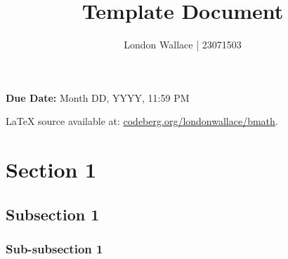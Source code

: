 \documentclass{article}
\title{Template Document}
\author{London Wallace | 23071503}
\date{}
\begin{document}
\maketitle{}

\begin{flushleft}
	\textbf{Due Date:} Month DD, YYYY, 11:59 PM

	LaTeX source available at: \href{https://codeberg.org/londonwallace/bmath}{codeberg.org/londonwallace/bmath}.
\end{flushleft}

\section{Section 1}
\subsection{Subsection 1}
\subsubsection{Sub-subsection 1}
\end{document}
